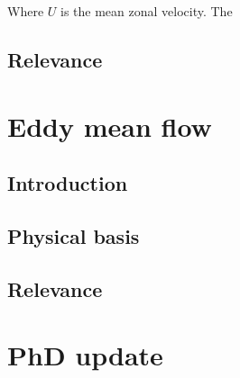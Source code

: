 \documentclass{article}
\begin{document}
Where $U$ is the mean zonal velocity. The


\subsection*{Relevance}


 

\section*{Eddy mean flow}

\subsection*{Introduction}


\subsection*{Physical basis}


\subsection*{Relevance}


\section*{PhD update}





\printbibliography
\end{document}

